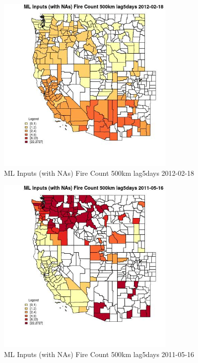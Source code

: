 \clearpage 

\begin{figure} 
\centering  
\includegraphics[width=0.77\textwidth]{Code_Outputs/Report_ML_input_PM25_Step4_part_f_de_duplicated_aves_prioritize_24hr_obswNAs_CountyFire_Count_500km_lag5daysMean2012-02-18.jpg} 
\caption{\label{fig:Report_ML_input_PM25_Step4_part_f_de_duplicated_aves_prioritize_24hr_obswNAsCountyFire_Count_500km_lag5daysMean2012-02-18}ML Inputs (with NAs) Fire Count 500km lag5days 2012-02-18} 
\end{figure} 
 

\begin{figure} 
\centering  
\includegraphics[width=0.77\textwidth]{Code_Outputs/Report_ML_input_PM25_Step4_part_f_de_duplicated_aves_prioritize_24hr_obswNAs_CountyFire_Count_500km_lag5daysMean2011-05-16.jpg} 
\caption{\label{fig:Report_ML_input_PM25_Step4_part_f_de_duplicated_aves_prioritize_24hr_obswNAsCountyFire_Count_500km_lag5daysMean2011-05-16}ML Inputs (with NAs) Fire Count 500km lag5days 2011-05-16} 
\end{figure} 
 

